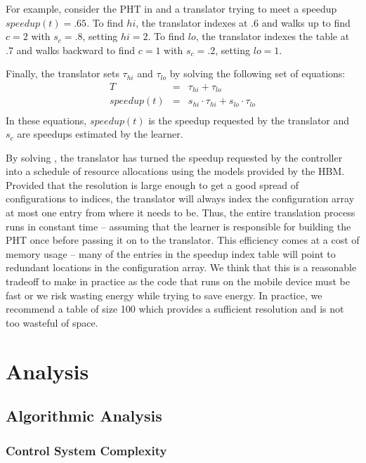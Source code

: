 For example, consider the PHT in  and a translator trying
to meet a speedup $speedup(t) = .65$.  To find $hi$, the translator indexes
at .6 and walks up to find $c=2$ with $s_c=.8$, setting $hi = 2$.  To
find $lo$, the translator indexes the table at .7 and walks backward
to find $c=1$ with $s_c=.2$, setting $lo = 1$.

Finally, the translator sets $\tau_{hi}$ and $\tau_{lo}$ by solving the
following set of equations:
\begin{eqnarray}
  T &=& \tau_{hi} + \tau_{lo}    \label{eqn:s1} \\
  speedup(t) &=& s_{hi} \cdot \tau_{hi} + s_{lo} \cdot \tau_{lo} \label{eqn:s2} \\
  \label{eq:pht}
\end{eqnarray}
In these equations, $speedup(t)$ is the speedup requested by the translator
and $s_c$ are speedups estimated by the learner.

By solving , the translator has turned the speedup
requested by the controller into a schedule of resource allocations
using the models provided by the HBM.  Provided that the resolution is
large enough to get a good spread of configurations to indices, the
translator will always index the configuration array at most one entry
from where it needs to be.  Thus, the entire translation process runs
in constant time -- assuming that the learner is responsible for
building the PHT once before passing it on to the translator.  This
efficiency comes at a cost of memory usage -- many of the entries in
the speedup index table will point to redundant locations in the
configuration array.  We think that this is a reasonable tradeoff to
make in practice as the code that runs on the mobile device must be
fast or we risk wasting energy while trying to save energy.  In
practice, we recommend a table of size 100 which provides a sufficient
resolution and is not too wasteful of space.

\section{Analysis}
\subsection{Algorithmic Analysis}

\subsubsection{Control System Complexity}

